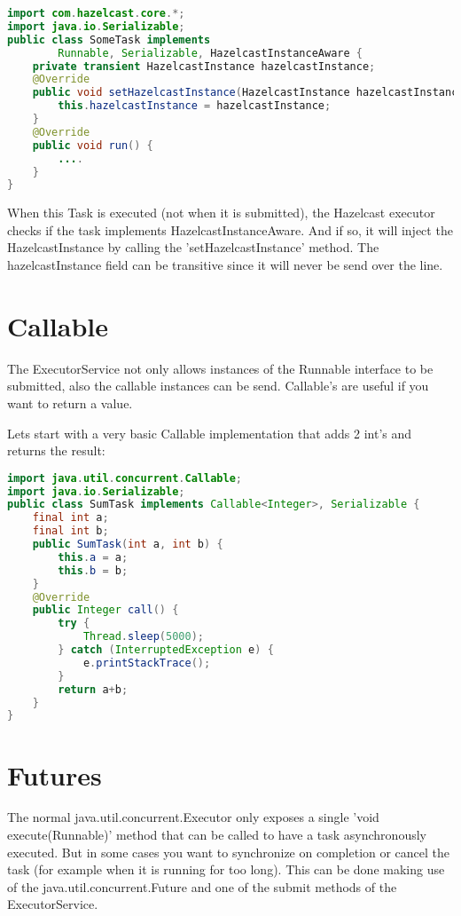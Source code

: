 \begin{lstlisting}[language=java]
import com.hazelcast.core.*;
import java.io.Serializable;
public class SomeTask implements
        Runnable, Serializable, HazelcastInstanceAware {
    private transient HazelcastInstance hazelcastInstance;
    @Override
    public void setHazelcastInstance(HazelcastInstance hazelcastInstance) {
        this.hazelcastInstance = hazelcastInstance;
    }
    @Override
    public void run() {
        ....
    }
}
\end{lstlisting}
When this Task is executed (not when it is submitted), the Hazelcast executor checks if the task implements HazelcastInstanceAware. And if so, it will inject the HazelcastInstance by calling the 'setHazelcastInstance' method. The hazelcastInstance field can be transitive since it will never be send over the line. 

\section{Callable}
The ExecutorService not only allows instances of the Runnable interface to be submitted, also the callable instances can be send. Callable's are useful if you want to return a value.

Lets start with a very basic Callable implementation that adds 2 int's and returns the result:
\begin{lstlisting}[language=java]
import java.util.concurrent.Callable;
import java.io.Serializable;
public class SumTask implements Callable<Integer>, Serializable {
    final int a;
    final int b;
    public SumTask(int a, int b) {
        this.a = a;
        this.b = b;
    }
    @Override
    public Integer call() {
        try {
            Thread.sleep(5000); 
        } catch (InterruptedException e) {
            e.printStackTrace();
        }	    
        return a+b;
    }
}

\end{lstlisting}

\section{Futures}
The normal java.util.concurrent.Executor only exposes a single 'void execute(Runnable)' method that can be called to have a task asynchronously executed. But in some cases you want to synchronize on completion or cancel the task (for example when it is running for too long). This can be done making use of the java.util.concurrent.Future and one of the submit methods of the ExecutorService.

